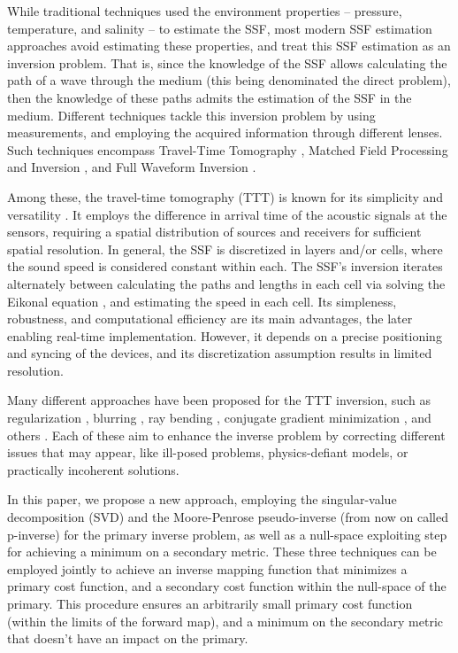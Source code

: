 While traditional techniques used the environment properties -- pressure, temperature, and salinity -- to estimate the SSF, most modern SSF estimation approaches avoid estimating these properties, and treat this SSF estimation as an inversion problem. That is, since the knowledge of the SSF allows calculating the path of a wave through the medium (this being denominated the direct problem), then the knowledge of these paths admits the estimation of the SSF in the medium. Different techniques tackle this inversion problem by using measurements, and employing the acquired information through different lenses. Such techniques encompass Travel-Time Tomography \cite{bormann_seismic_2012,stefanov_travel_2019}, Matched Field Processing \cite{gemba_adaptive_2017,brienzo_broadband_1993} and Inversion \cite{dosso_bayesian_2011}, and Full Waveform Inversion \cite{virieux_overview_2009,fichtner_multiscale_2013}.

Among these, the travel-time tomography (TTT) is known for its simplicity and versatility \cite{aki_determination_1977,dines_computerized_1979,phillips_traveltime_1991}. It employs the difference in arrival time of the acoustic signals at the sensors, requiring a spatial distribution of sources and receivers for sufficient spatial resolution. In general, the SSF is discretized in layers and/or cells, where the sound speed is considered constant within each. The SSF's inversion iterates alternately between calculating the paths and lengths in each cell via solving the Eikonal equation \cite{fast-marching,fast-sweeping,ray-tracing}, and estimating the speed in each cell. Its simpleness, robustness, and computational efficiency are its main advantages, the later enabling real-time implementation. However, it depends on a precise positioning and syncing of the devices, and its discretization assumption results in limited resolution.

Many different approaches have been proposed for the TTT inversion, such as regularization \cite{aki_determination_1976,aki_determination_1977}, blurring \cite{phillips_traveltime_1991,ali_opensource_2019}, ray bending \cite{jeong_investigating_2024,hormati_robust_2010}, conjugate gradient minimization \cite{zhang_nonlinear_1998,tang_travel_2024}, and others \cite{zhang_nonlinear_1998,jeong_investigating_2024}. Each of these aim to enhance the inverse problem by correcting different issues that may appear, like ill-posed problems, physics-defiant models, or practically incoherent solutions.

In this paper, we propose a new approach, employing the singular-value decomposition (SVD) and the Moore-Penrose pseudo-inverse (from now on called p-inverse) for the primary inverse problem, as well as a null-space exploiting step for achieving a minimum on a secondary metric. These three techniques can be employed jointly to achieve an inverse mapping function that minimizes a primary cost function, and a secondary cost function within the null-space of the primary. This procedure ensures an arbitrarily small primary cost function (within the limits of the forward map), and a minimum on the secondary metric that doesn't have an impact on the primary.

